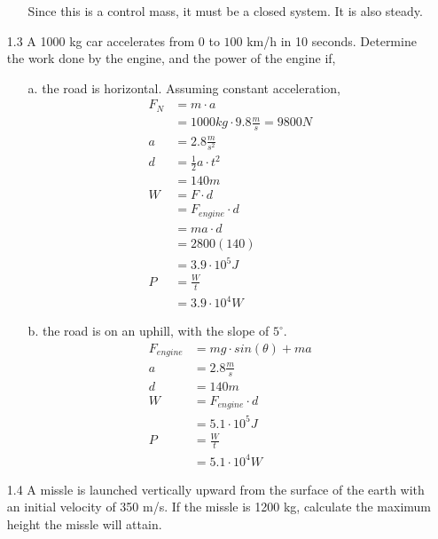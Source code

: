 \documentclass[10pt, a4paper]{article}
\begin{document}
\begin{enumerate}
\begin{enumerate}
        Since this is a control mass, it must be a closed system. It is also steady.
    \end{enumerate}

  \item[1.3] A 1000 kg car accelerates from 0 to $100$ km/h in 10 seconds. Determine the work done by the engine, and the power of the engine if,
    \begin{enumerate}
      \item[a.] the road is horizontal. Assuming constant acceleration,
        \begin{align}
         F_N &= m \cdot a \\
         &= 1000kg \cdot 9.8\frac{m}{s} = 9800 N \\
         a &= 2.8\frac{m}{s^2} \\
         d &= \frac{1}{2}a\cdot t^2 \\
           &= 140 m \\
         W &= F \cdot d \\
           &= F_{engine} \cdot d \\
           &= ma \cdot d \\
           &= 2800(140) \\
           &= 3.9 \cdot 10^5 J \\
         P &= \frac{W}{t} \\
           &= 3.9 \cdot 10^{4} W
       \end{align}

       \setcounter{equation}{0}

      \item[b.] the road is on an uphill, with the slope of $5^{\circ}$.
        \begin{align}
         F_{engine} &= mg\cdot sin(\theta) + ma \\
         a &= 2.8\frac{m}{s} \\
         d &= 140m \\
         W &= F_{engine} \cdot d \\
         &= 5.1 \cdot 10^5 J \\
         P &= \frac{W}{t} \\
          &= 5.1 \cdot 10^4 W
        \end{align}

    \end{enumerate}
  \item[1.4] A missle is launched vertically upward from the surface of the earth with an initial velocity of 350 m/s. If the missle is 1200 kg, calculate the maximum height the missle will attain.


\end{enumerate}
\end{document}
